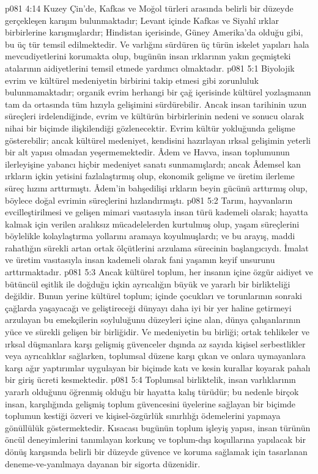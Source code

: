 \vs p081 4:14 Kuzey Çin’de, Kafkas ve Moğol türleri arasında belirli bir düzeyde gerçekleşen karışım bulunmaktadır; Levant içinde Kafkas ve Siyahî ırklar birbirlerine karışmışlardır; Hindistan içerisinde, Güney Amerika’da olduğu gibi, bu üç tür temsil edilmektedir. Ve varlığını sürdüren üç türün iskelet yapıları hala mevcudiyetlerini korumakta olup, bugünün insan ırklarının yakın geçmişteki atalarının aidiyetlerini temsil etmede yardımcı olmaktadır.
\vs p081 5:1 Biyolojik evrim ve kültürel medeniyetin birbirini takip etmesi gibi zorunluluk bulunmamaktadır; organik evrim herhangi bir çağ içerisinde kültürel yozlaşmanın tam da ortasında tüm hızıyla gelişimini sürdürebilir. Ancak insan tarihinin uzun süreçleri irdelendiğinde, evrim ve kültürün birbirlerinin nedeni ve sonucu olarak nihai bir biçimde ilişkilendiği gözlenecektir. Evrim kültür yokluğunda gelişme gösterebilir; ancak kültürel medeniyet, kendisini hazırlayan ırksal gelişimin yeterli bir alt yapısı olmadan yeşermemektedir. Âdem ve Havva, insan toplumunun ilerleyişine yabancı hiçbir medeniyet sanatı sunmamışlardı; ancak Âdemsel kan ırkların içkin yetisini fazlalaştırmış olup, ekonomik gelişme ve üretim ilerleme süreç hızını arttırmıştı. Âdem’in bahşedilişi ırkların beyin gücünü arttırmış olup, böylece doğal evrimin süreçlerini hızlandırmıştı.
\vs p081 5:2 Tarım, hayvanların evcilleştirilmesi ve gelişen mimari vasıtasıyla insan türü kademeli olarak; hayatta kalmak için verilen aralıksız mücadelelerden kurtulmuş olup, yaşam süreçlerini böylelikle kolaylaştırma yollarını aramaya koyulmuşlardı; ve bu arayış, maddi rahatlığın sürekli artan ortak ölçütlerini arzulama sürecinin başlangıcıydı. İmalat ve üretim vasıtasıyla insan kademeli olarak fani yaşamın keyif unsurunu arttırmaktadır.
\vs p081 5:3 Ancak kültürel toplum, her insanın içine özgür aidiyet ve bütüncül eşitlik ile doğduğu içkin ayrıcalığın büyük ve yararlı bir birlikteliği değildir. Bunun yerine kültürel toplum; içinde çocukları ve torunlarının sonraki çağlarda yaşayacağı ve geliştireceği dünyayı daha iyi bir yer haline getirmeyi arzulayan bu emekçilerin soyluluğunu düzeyleri içine alan, dünya çalışanlarının yüce ve sürekli gelişen bir birliğidir. Ve medeniyetin bu birliği; ortak tehlikeler ve ırksal düşmanlara karşı gelişmiş güvenceler dışında az sayıda kişisel serbestlikler veya ayrıcalıklar sağlarken, toplumsal düzene karşı çıkan ve onlara uymayanlara karşı ağır yaptırımlar uygulayan bir biçimde katı ve kesin kurallar koyarak pahalı bir giriş ücreti kesmektedir.
\vs p081 5:4 Toplumsal birliktelik, insan varlıklarının yararlı olduğunu öğrenmiş olduğu bir hayatta kalış türüdür; bu nedenle birçok insan, karşılığında gelişmiş toplum güvencesini üyelerine sağlayan bir biçimde toplumun kestiği özveri ve kişisel\hyp{}özgürlük sınırlılığı ödemelerini yapmaya gönüllülük göstermektedir. Kısacası bugünün toplum işleyiş yapısı, insan türünün öncül deneyimlerini tanımlayan korkunç ve toplum\hyp{}dışı koşullarına yapılacak bir dönüş karşısında belirli bir düzeyde güvence ve koruma sağlamak için tasarlanan deneme\hyp{}ve\hyp{}yanılmaya dayanan bir sigorta düzenidir.
